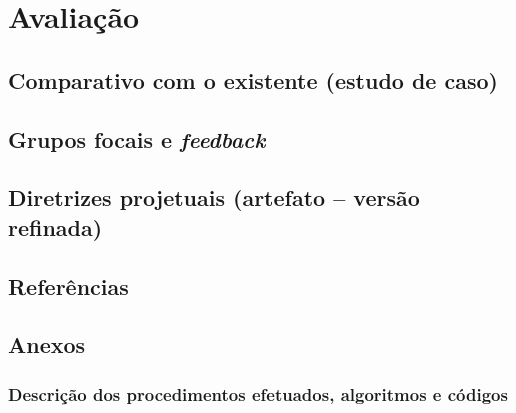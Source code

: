 \documentclass[]{report}
\begin{document}
\part[Avaliação]{Avaliação}
	\chapter{Comparativo com o existente (estudo de caso)}
	\chapter{Grupos focais e \textit{feedback}}
	\chapter{Diretrizes projetuais (artefato – versão refinada)}

\chapter*{Referências}

\chapter*{Anexos}

\section*{Descrição dos procedimentos efetuados, algoritmos e códigos}
\end{document}
